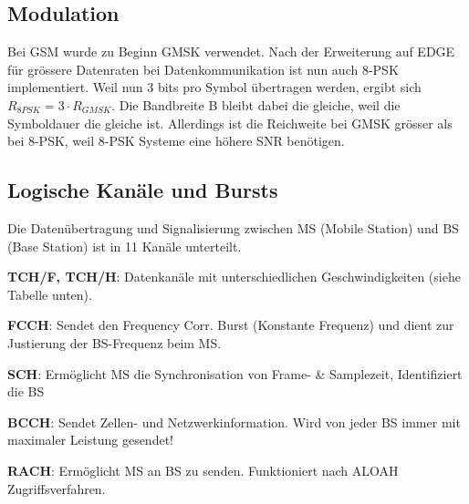 \subsection{Modulation }
	Bei GSM wurde zu Beginn GMSK verwendet. Nach der Erweiterung auf EDGE für grössere Datenraten 
	bei Datenkommunikation ist nun auch 8-PSK implementiert. 
	Weil nun 3 bits pro Symbol übertragen werden, ergibt sich $R_{8PSK}=3\cdot R_{GMSK}$. Die 
	Bandbreite B bleibt dabei die gleiche, weil die Symboldauer die gleiche ist. Allerdings 
	ist die Reichweite bei GMSK grösser als bei 8-PSK, weil 8-PSK Systeme eine höhere SNR benötigen.
	
\subsection{Logische Kanäle und Bursts}
    Die Datenübertragung und Signalisierung zwischen MS (Mobile Station) und BS (Base Station) ist in 11 Kanäle 
    unterteilt.
    \begin{liste}
        \item \textbf{TCH/F, TCH/H}: Datenkanäle mit unterschiedlichen Geschwindigkeiten (siehe Tabelle unten).
        \item \textbf{FCCH}: Sendet den  Frequency Corr. Burst (Konstante Frequenz) und dient zur Justierung der BS-Frequenz beim MS.
        \item \textbf{SCH}: Ermöglicht MS die Synchronisation von Frame- \& Samplezeit, Identifiziert die BS
        \item \textbf{BCCH}: Sendet Zellen- und Netzwerkinformation. Wird von jeder BS immer mit maximaler Leistung gesendet!
        \item \textbf{RACH}: Ermöglicht MS an BS zu senden. Funktioniert nach ALOAH Zugriffsverfahren.
    \end{liste}

